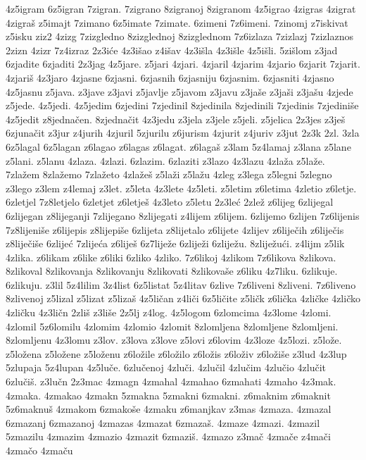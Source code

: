 {4z5igram
6z5igran
7zigran.
7zigrano
8zigranoj
8zigranom
4z5igrao
4zigras
4zigrat
4zigraš
z5imajt
7zimano
6z5imate
7zimate.
6zimeni
7z6imeni.
7zinomj
z7iskivat
z5isku
ziz2
4zizg
7zizgledno
8zizglednoj
8zizglednom
7z6izlaza
7zizlazj
7zizlaznos
2zizn
4zizr
7z4izraz
2z3iće
4z3išao
z4išav
4z3išla
4z3išle
4z5išli.
5zišlom
z3jad
6zjadite
6zjaditi
2z3jag
4z5jare.
z5jari
4zjari.
4zjaril
4zjarim
4zjario
6zjarit
7zjarit.
4zjariš
4z3jaro
4zjasne
6zjasni.
6zjasnih
6zjasniju
6zjasnim.
6zjasniti
4zjasno
4z5jasnu
z5java.
z3jave
z3javi
z5javlje
z5javom
z3javu
z3jaše
z3jaši
z3jašu
4zjede
z5jede.
4z5jedi.
4z5jedim
6zjedini
7zjedinil
8zjedinila
8zjedinili
7zjedinis
7zjediniše
4z5jedit
z8jednačen.
8zjednačit
4z3jedu
z3jela
z3jele
z5jeli.
z5jelica
2z3jes
z3ješ
6zjunačit
z3jur
z4jurih
4zjuril
5zjurilu
z6jurism
4zjurit
z4juriv
z3jut
2z3k
2zl.
3zla
6z5lagal
6z5lagan
z6lagao
z6lagas
z6lagat.
z6lagaš
z3lam
5z4lamaj
z3lana
z5lane
z5lani.
z5lanu
4zlaza.
4zlazi.
6zlazim.
6zlaziti
z3lazo
4z3lazu
4zlaža
z5laže.
7zlažem
8zlažemo
7zlažeto
4zlažeš
z5laži
z5lažu
4zleg
z3lega
z5legni
5zlegno
z3lego
z3lem
z4lemaj
z3let.
z5leta
4z3lete
4z5leti.
z5letim
z6letima
4zletio
z6letje.
6zletjel
7z8letjelo
6zletjet
z6letješ
4z3leto
z5letu
2z3leć
2zlež
z6lijeg
6zlijegal
6zlijegan
z8lijeganji
7zlijegano
8zlijegati
z4lijem
z6lijem.
6zlijemo
6zlijen
7z6lijenis
7z8lijeniše
z6lijepis
z8lijepiše
6zlijeta
z8lijetalo
z6lijete
4zlijev
z6liječih
z6liječis
z8liječiše
6zlijeć
7zlijeća
z6liješ
6z7liježe
6zliježi
6zliježu.
8zliježući.
z4lijm
z5lik
4zlika.
z6likam
z6like
z6liki
6zliko
4zliko.
7z6likoj
4zlikom
7z6likova
8zlikova.
8zlikoval
8zlikovanja
8zlikovanju
8zlikovati
8zlikovaše
z6liku
4z7liku.
6zlikuje.
6zlikuju.
z3lil
5z4lilim
3z4list
6z5listat
5z4litav
6zlive
7z6liveni
8zliveni.
7z6liveno
8zlivenoj
z5lizal
z5lizat
z5lizaš
4z5ličan
z4liči
6z5ličite
z5ličk
z6lička
4zličke
4zličko
4zličku
4z3ličn
2zliš
z3liše
2z5lj
z4log.
4z5logom
6zlomcima
4z3lome
4zlomi.
4zlomil
5z6lomilu
4zlomim
4zlomio
4zlomit
8zlomljena
8zlomljene
8zlomljeni.
8zlomljenu
4z3lomu
z3lov.
z3lova
z3love
z5lovi
z6lovim
4z3loze
4z5lozi.
z5lože.
z5ložena
z5ložene
z5loženu
z6ložile
z6ložilo
z6ložis
z6loživ
z6ložiše
z3lud
4z3lup
5zlupaja
5z4lupan
4z5luče.
6zlučenoj
4zluči.
4zlučil
4zlučim
4zlučio
4zlučit
6zlučiš.
z3lučn
2z3mac
4zmagn
4zmahal
4zmahao
6zmahati
4zmaho
4z3mak.
4zmaka.
4zmakao
4zmakn
5zmakna
5zmakni
6zmakni.
z6maknim
z6maknit
5z6maknuš
4zmakom
6zmakoše
4zmaku
z6manjkav
z3mas
4zmaza.
4zmazal
6zmazanj
6zmazanoj
4zmazas
4zmazat
6zmazaš.
4zmaze
4zmazi.
4zmazil
5zmazilu
4zmazim
4zmazio
4zmazit
6zmaziš.
4zmazo
z3mač
4zmače
z4mači
4zmačo
4zmaču
}
